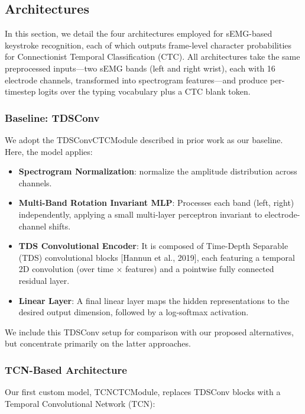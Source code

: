 \subsection{Architectures}

In this section, we detail the four architectures employed for sEMG-based keystroke recognition, each of which outputs frame-level character probabilities for Connectionist Temporal Classification (CTC). All architectures take the same preprocessed inputs—two sEMG bands (left and right wrist), each with 16 electrode channels, transformed into spectrogram features—and produce per-timestep logits over the typing vocabulary plus a CTC blank token.

\subsubsection{Baseline: TDSConv}

We adopt the TDSConvCTCModule described in prior work as our baseline. Here, the model applies:

\begin{itemize} 
    \item\textbf{Spectrogram Normalization}: normalize the amplitude distribution across channels.

    \item\textbf{Multi-Band Rotation Invariant MLP}: Processes each band (left, right) independently, applying a small multi-layer perceptron invariant to electrode-channel shifts.

    \item\textbf{TDS Convolutional Encoder}: It is composed of Time-Depth Separable (TDS) convolutional blocks [Hannun et al., 2019], each featuring a temporal 2D convolution (over time × features) and a pointwise fully connected residual layer.
    \item\textbf{Linear Layer}: A final linear layer maps the hidden representations to the desired output dimension, followed by a log-softmax activation.
\end{itemize}

We include this TDSConv setup for comparison with our proposed alternatives, but concentrate primarily on the latter approaches.

\subsubsection{TCN-Based Architecture}

Our first custom model, TCNCTCModule, replaces TDSConv blocks with a Temporal Convolutional Network (TCN):

